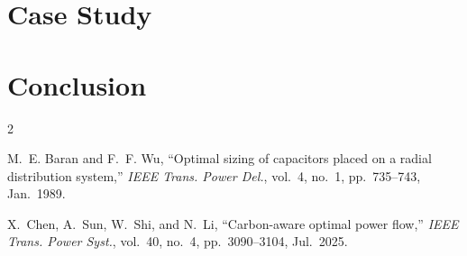\documentclass[journal]{IEEEtran}
\begin{document}
\section{Case Study}
\label{sec:case}


\section{Conclusion}
\label{sec:conclusion}

\begin{thebibliography}{2}

M.~E. Baran and F.~F. Wu, ``Optimal sizing of capacitors placed on a
radial distribution system,'' \emph{IEEE Trans. Power Del.}, vol.~4,
no.~1, pp.~735--743, Jan.~1989.

X.~Chen, A.~Sun, W.~Shi, and N.~Li, ``Carbon-aware optimal power flow,'' \emph{IEEE Trans. Power Syst.}, vol.~40, no.~4, pp.~3090--3104, Jul.~2025.

\end{thebibliography}
\end{document}
